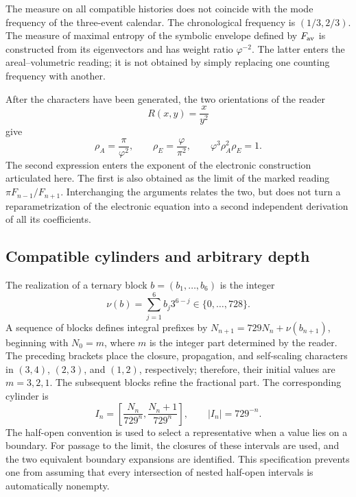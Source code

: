 The measure on all compatible histories does not coincide with the mode frequency of the three-event calendar. The chronological frequency is \((1/3,2/3)\). The measure of maximal entropy of the symbolic envelope defined by \(F_{\rm av}\) is constructed from its eigenvectors and has weight ratio \(\varphi^{-2}\). The latter enters the areal--volumetric reading; it is not obtained by simply replacing one counting frequency with another.




After the characters have been generated, the two orientations of the reader
\[
 R(x,y)=\frac{x}{y^2}
\]
give
\begin{equation}
 \rho_A=\frac\pi{\varphi^2},\qquad
 \rho_E=\frac\varphi{\pi^2},\qquad
 \varphi^3\rho_A^2\rho_E=1.
 \label{eq:areal-electron}
\end{equation}
The second expression enters the exponent of the electronic construction articulated here. The first is also obtained as the limit of the marked reading \(\pi F_{n-1}/F_{n+1}\). Interchanging the arguments relates the two, but does not turn a reparametrization of the electronic equation into a second independent derivation of all its coefficients.



\subsection{Compatible cylinders and arbitrary depth}

The realization of a ternary block \(b=(b_1,\ldots,b_6)\) is the integer
\[
 \nu(b)=\sum_{j=1}^6b_j3^{6-j}\in\{0,\ldots,728\}.
\]
A sequence of blocks defines integral prefixes by \(N_{n+1}=729N_n+\nu(b_{n+1})\), beginning with \(N_0=m\), where \(m\) is the integer part determined by the reader. The preceding brackets place the closure, propagation, and self-scaling characters in \((3,4)\), \((2,3)\), and \((1,2)\), respectively; therefore, their initial values are \(m=3,2,1\). The subsequent blocks refine the fractional part. The corresponding cylinder is
\begin{equation}
 I_n=\left[\frac{N_n}{729^n},\frac{N_n+1}{729^n}\right],
 \qquad |I_n|=729^{-n}.
 \label{eq:cilindro}
\end{equation}
The half-open convention is used to select a representative when a value lies on a boundary. For passage to the limit, the closures of these intervals are used, and the two equivalent boundary expansions are identified. This specification prevents one from assuming that every intersection of nested half-open intervals is automatically nonempty.

